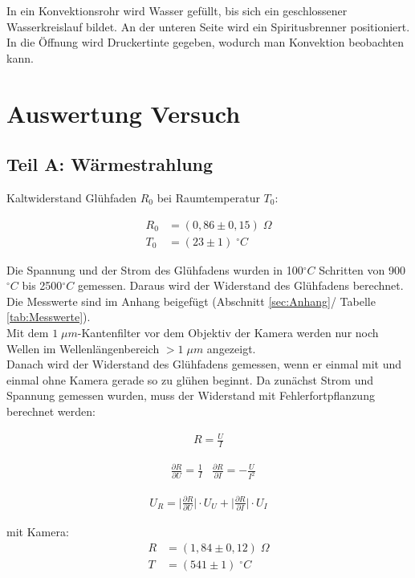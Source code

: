 \documentclass[a4paper]{scrartcl}
\numberwithin{equation}{subsection}
\begin{document}
In ein Konvektionsrohr wird Wasser gefüllt, bis sich ein geschlossener Wasserkreislauf bildet.
An der unteren Seite wird ein Spiritusbrenner positioniert.
In die Öffnung wird Druckertinte gegeben, wodurch man Konvektion beobachten kann.

\newpage
\section{Auswertung Versuch}
\subsection{Teil A: Wärmestrahlung}
Kaltwiderstand Glühfaden $R_0$ bei Raumtemperatur $T_0$:

\begin{align*}
R_0 &= (0,86\pm 0,15)\;\Omega\\
T_0 &= (23\pm 1)\;^\circ C
\end{align*}

Die Spannung und der Strom des Glühfadens wurden in 100$^\circ C$  Schritten von 900$^\circ C$ bis 2500$^\circ C$ gemessen.
Daraus wird der Widerstand des Glühfadens berechnet.
Die Messwerte sind im Anhang beigefügt (Abschnitt \ref{sec:Anhang}/ Tabelle \ref{tab:Messwerte}).\\
Mit dem $1\;\mu m$-Kantenfilter vor dem Objektiv der Kamera werden nur noch Wellen im Wellenlängenbereich $>1\;\mu m$ angezeigt.\\
Danach wird der Widerstand des Glühfadens gemessen, wenn er einmal mit und einmal ohne Kamera gerade so zu glühen beginnt.
Da zunächst Strom und Spannung gemessen wurden, muss der Widerstand mit Fehlerfortpflanzung berechnet werden:

\begin{align*}
R = \frac{U}{I}
\end{align*}

\begin{align*}
&\frac{\partial R}{\partial U} = \frac{1}{I}
&\frac{\partial R}{\partial I} = - \frac{U}{I^2}
\end{align*}

\begin{align}
U_R = \bigg | \frac{\partial R}{\partial U} \bigg | \cdot U_U + \bigg | \frac{\partial R}{\partial I} \bigg | \cdot U_I
\end{align}

mit Kamera:
\begin{align*}
R&=(1,84\pm 0,12)\;\Omega\\
T&=(541 \pm 1)\;^\circ C
\end{align*}
\end{document}
